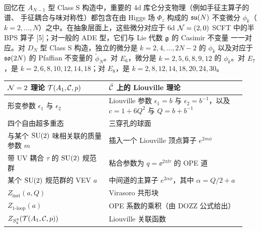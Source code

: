 
回忆在 $A_{N-1}$ 型 Class S 构造中，重要的 4d 库仑分支物理（例如手征主算子的谱、
手征耦合与味对称性）都包含在由 Higgs 场 $\Phi_z$ 构成的 $\mathfrak{su}(N)$ 不变微分
$\phi_k$（$k=2,\dots,N$）之中。在抽象层面上，这些微分对应于 6d $\mathcal{N}=(2,0)$ SCFT
中的半 BPS 算子 [5]；对一般的 ADE 型，它们与 Lie 代数 $\mathfrak{g}$ 的 Casimir 不变量
一一对应。对 $D_N$ 型 Class S 构造，独立的微分是 $k=2,4,\dots,2N-2$ 的 $\phi_k$
以及对应于 $\mathfrak{so}(2N)$ 的 Pfaffian 不变量的 $\tilde{\phi}_N$。对 $E_6$，微分是
$k=2,5,6,8,9,12$ 的 $\phi_k$。对 $E_7$，是 $k=2,6,8,10,12,14,18$；对 $E_8$，是
$k=2,8,12,14,18,20,24,30$。



\begin{center}
\small
\begin{tabular}{>{\centering\arraybackslash}p{0.40\linewidth}
                >{\centering\arraybackslash}p{0.54\linewidth}}
\toprule
$\mathcal{N}=2$ 理论 $\mathcal{T}(A_1,\mathcal{C},p)$ & $\bar{\mathcal{C}}$ 上的 Liouville 理论 \\
\midrule
形变参数 $\epsilon_1$ 与 $\epsilon_2$
  & Liouville 参数 $\epsilon_1=b$ 与 $\epsilon_2=b^{-1}$，以及
    $c=1+6Q^2$ 与 $Q=b+b^{-1}$ \\
四个自由超多重态 & 三穿孔的球面 \\
与某个 $\mathrm{SU}(2)$ 味相关联的质量参数 $m$ & 插入一个 Liouville 顶点算子 $e^{2m\phi}$ \\
带 UV 耦合 $\tau$ 的 $\mathrm{SU}(2)$ 规范群 & 粘合参数为 $q=\ee^{2\pi\ii\tau}$ 的 OPE 道 \\
某个 $\mathrm{SU}(2)$ 规范群的 VEV $a$
  & 中间道的主算子 $e^{2\alpha\phi}$，其中 $\alpha=Q/2+a$ \\
$Z_{\mathrm{inst}}(a,Q)$ & Virasoro 共形块 \\
$Z_{1\text{-loop}}(a)$ & OPE 系数的乘积（由 DOZZ 公式给出） \\
$Z_{S^4_b}(\mathcal{T}(A_1,\mathcal{C},p))$ & Liouville 关联函数 \\
\bottomrule
\end{tabular}
\end{center}

